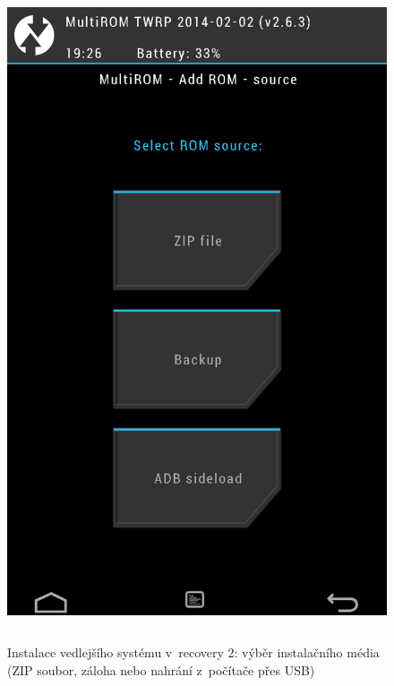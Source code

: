 \documentclass[12pt, a4paper, oneside]{article}
\begin{document}
\begin{figure}[H]
\begin{center}
 \includegraphics[height=550pt]{img/recovery_install2.png}
\caption{Instalace vedlejšího systému v~recovery 2: výběr instalačního média (ZIP soubor, záloha nebo nahrání z~počítače přes USB)}
\end{center}
\end{figure}
\end{document}

